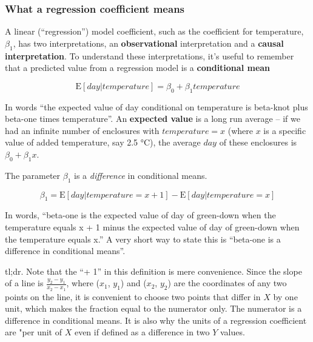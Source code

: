 \documentclass[]{book}
\begin{document}
\hypertarget{what-a-regression-coefficient-means}{%
\subsubsection{What a regression coefficient means}\label{what-a-regression-coefficient-means}}

A linear (``regression'') model coefficient, such as the coefficient for temperature, \(\beta_1\), has two interpretations, an \textbf{observational} interpretation and a \textbf{causal interpretation}. To understand these interpretations, it's useful to remember that a predicted value from a regression model is a \textbf{conditional mean}

\begin{equation}
\textrm{E}[day|temperature] = \beta_0 + \beta_1 temperature
\label{eq:continuous-x-conditional-mean}
\end{equation}

In words ``the expected value of day conditional on temperature is beta-knot plus beta-one times temperature''. An \textbf{expected value} is a long run average -- if we had an infinite number of enclosures with \(temperature=x\) (where \(x\) is a specific value of added temperature, say 2.5 °C), the average \(day\) of these enclosures is \(\beta_0 + \beta_1 x\).

The parameter \(\beta_1\) is a \emph{difference} in conditional means.

\begin{equation}
\beta_1 = \textrm{E}[day|temperature = x+1] - \textrm{E}[day|temperature = x]
\label{eq:beta}
\end{equation}

In words, ``beta-one is the expected value of day of green-down when the temperature equals x + 1 minus the expected value of day of green-down when the temperature equals x.'' A very short way to state this is ``beta-one is a difference in conditional means''.

tl;dr. Note that the ``+ 1'' in this definition is mere convenience. Since the slope of a line is \(\frac{y_2 - y_1}{x_2 - x_1}\), where (\(x_1\), \(y_1\)) and (\(x_2\), \(y_2\)) are the coordinates of any two points on the line, it is convenient to choose two points that differ in \(X\) by one unit, which makes the fraction equal to the numerator only. The numerator is a difference in conditional means. It is also why the units of a regression coefficient are "per unit of \(X\) even if defined as a difference in two \(Y\) values.
\end{document}
